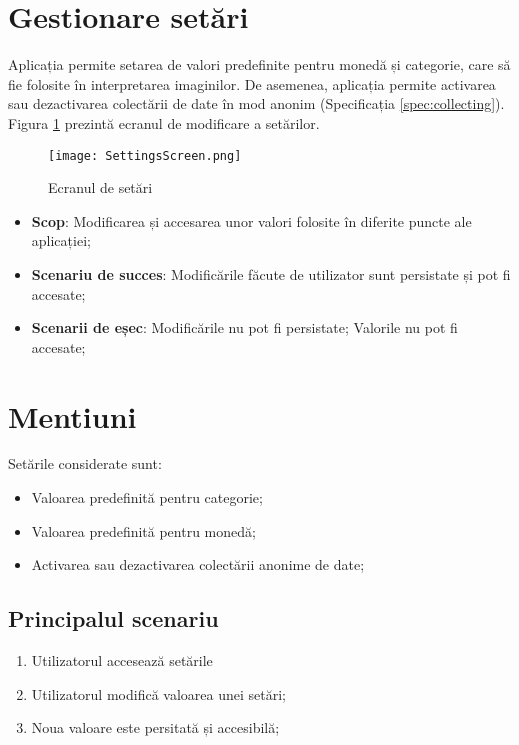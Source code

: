 \section{Gestionare setări}\label{spec:setari}

Aplicația permite setarea de valori predefinite pentru monedă și categorie, care să fie folosite în interpretarea imaginilor. De asemenea, aplicația permite activarea sau dezactivarea colectării de date în mod anonim (Specificația \ref{spec:collecting}). Figura \ref{fig:settingsScreen} prezintă ecranul de modificare a setărilor. 

\begin{figure}[h]
  \centering
  \texttt{[image: SettingsScreen.png]}
  \caption{Ecranul de setări}
  \label{fig:settingsScreen}
\end{figure}

\begin{itemize}
\item
  \textbf{Scop}: Modificarea și accesarea unor valori folosite în diferite puncte ale aplicației;
\item
  \textbf{Scenariu de succes}: Modificările făcute de utilizator sunt persistate și pot fi accesate;
\item
  \textbf{Scenarii de eșec}: Modificările nu pot fi persistate; Valorile nu pot fi accesate;
\end{itemize}

\begin{minipage}[t]{0.49\textwidth}

\section*{Mentiuni}
Setările considerate sunt:
\begin{itemize}
  \item
    Valoarea predefinită pentru categorie;
  \item
    Valoarea predefinită pentru monedă;
  \item
    Activarea sau dezactivarea colectării anonime de date;
\end{itemize}    

\end{minipage} \hspace{0.03\textwidth}
\begin{minipage}[t]{0.48\textwidth}
  
\subsection*{Principalul scenariu}
\begin{enumerate}
\item
  Utilizatorul accesează setările
\item
  Utilizatorul modifică valoarea unei setări;
\item
  Noua valoare este persitată și accesibilă;
\end{enumerate}  

\end{minipage}



